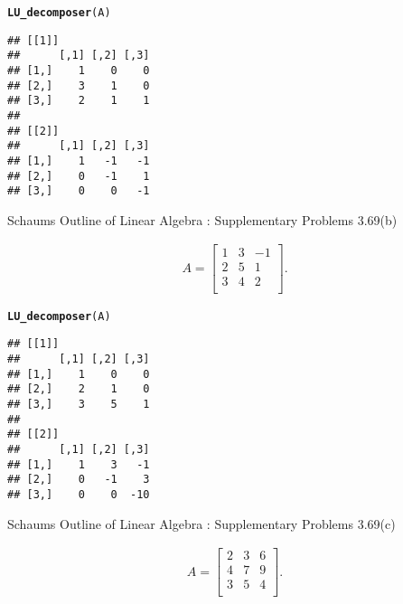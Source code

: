 \documentclass[11pt, a4paper]{article}\usepackage[]{graphicx}\usepackage[]{xcolor}
\makeatletter
\newcommand{\hldef}[1]{\textcolor[rgb]{0.345,0.345,0.345}{#1}}%
\newcommand{\hlkwd}[1]{\textcolor[rgb]{0.737,0.353,0.396}{\textbf{#1}}}%
\newenvironment{kframe}{%
 \def\at@end@of@kframe{}%
 \ifinner\ifhmode%
  \def\at@end@of@kframe{\end{minipage}}%
  \begin{minipage}{\columnwidth}%
 \fi\fi%
 \def\FrameCommand##1{\hskip\@totalleftmargin \hskip-\fboxsep
 \colorbox{shadecolor}{##1}\hskip-\fboxsep
     \hskip-\linewidth \hskip-\@totalleftmargin \hskip\columnwidth}%
 \MakeFramed {\advance\hsize-\width
   \@totalleftmargin\z@ \linewidth\hsize
   \@setminipage}}%
 {\par\unskip\endMakeFramed%
 \at@end@of@kframe}
\newenvironment{knitrout}{}{} %
\makeatother
\begin{document}
\begin{knitrout}
\color{fgcolor}\begin{kframe}
\begin{alltt}
\hlkwd{LU_decomposer}\hldef{(A)}
\end{alltt}
\begin{verbatim}
## [[1]]
##      [,1] [,2] [,3]
## [1,]    1    0    0
## [2,]    3    1    0
## [3,]    2    1    1
## 
## [[2]]
##      [,1] [,2] [,3]
## [1,]    1   -1   -1
## [2,]    0   -1    1
## [3,]    0    0   -1
\end{verbatim}
\end{kframe}
\end{knitrout}

\newpage

\leftpointright \hspace{0.2cm} Schaums Outline of Linear Algebra : Supplementary Problems 3.69(b)

\begin{gather*}
A = 
\begin{bmatrix}
1 & 3 & -1 \\
2 & 5 & 1 \\
3 & 4 & 2 \\
\end{bmatrix}.
\end{gather*}



\begin{knitrout}
\color{fgcolor}\begin{kframe}
\begin{alltt}
\hlkwd{LU_decomposer}\hldef{(A)}
\end{alltt}
\begin{verbatim}
## [[1]]
##      [,1] [,2] [,3]
## [1,]    1    0    0
## [2,]    2    1    0
## [3,]    3    5    1
## 
## [[2]]
##      [,1] [,2] [,3]
## [1,]    1    3   -1
## [2,]    0   -1    3
## [3,]    0    0  -10
\end{verbatim}
\end{kframe}
\end{knitrout}

\leftpointright \hspace{0.2cm} Schaums Outline of Linear Algebra : Supplementary Problems 3.69(c)

\begin{gather*}
A = 
\begin{bmatrix}
2 & 3 & 6 \\
4 & 7 & 9 \\
3 & 5 & 4 \\
\end{bmatrix}.
\end{gather*}
\end{document}
